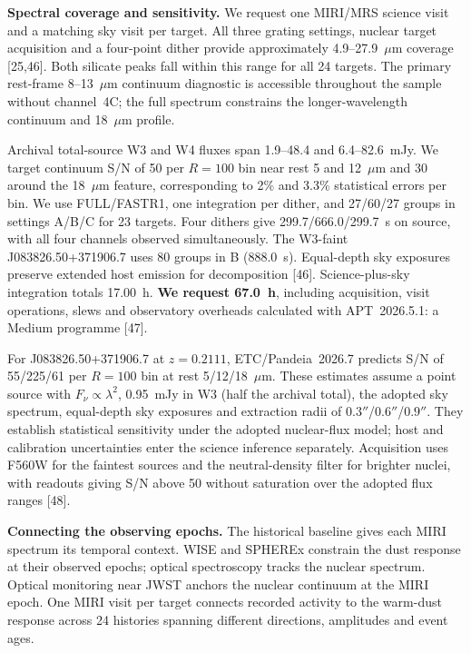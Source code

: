 \documentclass[12pt]{article}
\begin{document}
\descriptionofobservations

\noindent\textbf{Spectral coverage and sensitivity.}
We request one MIRI/MRS science visit and a matching sky visit per target. All three grating settings, nuclear target acquisition and a four-point dither provide approximately 4.9--27.9~$\mu$m coverage [25,46]. Both silicate peaks fall within this range for all 24 targets. The primary rest-frame 8--13~$\mu$m continuum diagnostic is accessible throughout the sample without channel~4C; the full spectrum constrains the longer-wavelength continuum and 18~$\mu$m profile.

Archival total-source W3 and W4 fluxes span 1.9--48.4 and 6.4--82.6~mJy. We target continuum S/N of 50 per $R=100$ bin near rest 5 and 12~$\mu$m and 30 around the 18~$\mu$m feature, corresponding to 2\% and 3.3\% statistical errors per bin. We use FULL/FASTR1, one integration per dither, and 27/60/27 groups in settings A/B/C for 23 targets. Four dithers give 299.7/666.0/299.7~s on source, with all four channels observed simultaneously. The W3-faint J083826.50+371906.7 uses 80 groups in B (888.0~s). Equal-depth sky exposures preserve extended host emission for decomposition [46]. Science-plus-sky integration totals 17.00~h. \textbf{We request 67.0~h}, including acquisition, visit operations, slews and observatory overheads calculated with APT~2026.5.1: a Medium programme [47].

For J083826.50+371906.7 at $z=0.2111$, ETC/Pandeia~2026.7 predicts S/N of 55/225/61 per $R=100$ bin at rest 5/12/18~$\mu$m. These estimates assume a point source with $F_\nu\propto\lambda^2$, 0.95~mJy in W3 (half the archival total), the adopted sky spectrum, equal-depth sky exposures and extraction radii of $0.3''$/$0.6''$/$0.9''$. They establish statistical sensitivity under the adopted nuclear-flux model; host and calibration uncertainties enter the science inference separately. Acquisition uses F560W for the faintest sources and the neutral-density filter for brighter nuclei, with readouts giving S/N above 50 without saturation over the adopted flux ranges [48].

\noindent\textbf{Connecting the observing epochs.}
The historical baseline gives each MIRI spectrum its temporal context. WISE and SPHEREx constrain the dust response at their observed epochs; optical spectroscopy tracks the nuclear spectrum. Optical monitoring near JWST anchors the nuclear continuum at the MIRI epoch. One MIRI visit per target connects recorded activity to the warm-dust response across 24 histories spanning different directions, amplitudes and event ages.
\end{document}
